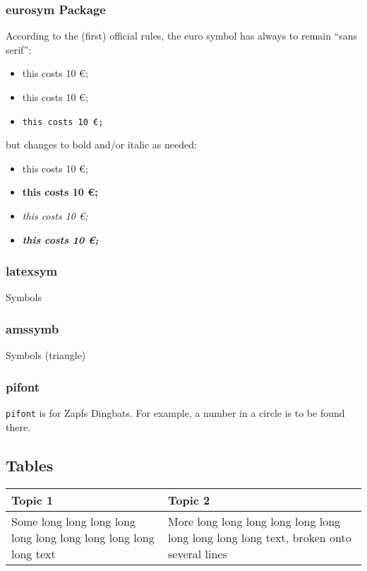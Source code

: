 \documentclass{mcreport}
\begin{document}
\subsubsection{eurosym Package}
\label{sec:eurosym-package}

According to the (first) official rules, the euro symbol has always to
remain ``sans serif'':

\begin{itemize}
    \item this costs 10 \euro;
    \item \textsf{this costs 10 \euro;}
    \item \texttt{this costs 10 \euro;}
\end{itemize}

but changes to bold and/or italic as needed:

\begin{itemize}
    \item this costs 10 \euro;
    \item \textbf{this costs 10 \euro;}
    \item \textit{this costs 10 \euro;}
    \item \textit{\textbf{this costs 10 \euro;}}
\end{itemize}

\subsubsection{latexsym}

Symbols

\subsubsection{amssymb}

Symbols (triangle)

\subsubsection{pifont}

\texttt{pifont} is for Zapfs Dingbats. For example, a number in a circle is
to be found there.

\subsection{Tables}
\label{sec:tables}

\begin{tabular}{|l|p{4cm}|} \hline
    Topic 1 & Topic 2 \\
    \hline
    Some long long long long long long long long long long long text &
    More long long long long long long long long long long text, broken onto
    several lines\\
    \hline
\end{tabular}
\end{document}
